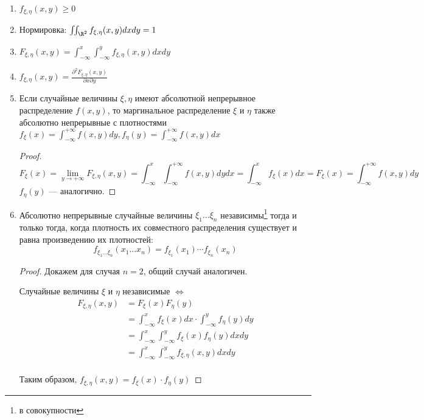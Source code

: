 \begin{prop}\itemfix
    \begin{enumerate}
        \item \(f_{\xi, \eta}(x, y) \geq 0\)
        \item Нормировка: \(\iint_{\R^2} f_{\xi, \eta}(x, y) dxdy = 1\)
        \item \(F_{\xi, \eta}(x, y) = \int_{-\infty}^x \int_{-\infty}^y f_{\xi, \eta}(x, y) dx dy\)
        \item \(f_{\xi, \eta}(x, y) = \frac{\partial^2 F_{\xi, \eta}(x, y)}{\partial x \partial y}\)
        \item Если случайные величины \(\xi, \eta\) имеют абсолютной непрерывное распределение \(f(x, y)\), то маргинальное распределение \(\xi\) и \(\eta\) также абсолютно непрерывные с плотностями \(f_\xi(x) = \int_{ -\infty}^{+\infty} f(x, y) dy, f_\eta(y) = \int_{ - \infty}^{+\infty} f(x, y) dx\)
              \begin{proof}
                  \[F_\xi(x) = \lim_{y \to +\infty} F_{\xi, \eta}(x, y) = \int_{ - \infty}^x \int_{ -\infty}^{+\infty} f(x, y) dy dx = \int_{ - \infty}^x f_\xi(x) dx = F_\xi(x) = \int_{ - \infty}^{+\infty} f(x, y) dy\]
                  \(f_\eta(y)\) --- аналогично.
              \end{proof}
        \item Абсолютно непрерывные случайные величины \(\xi_1 \dots \xi_n\) независимы\footnote{в совокупности} тогда и только тогда, когда плотность их совместного распределения существует и равна произведению их плотностей:
              \[f_{\xi_1 \dots \xi_n}(x_1 \dots x_n) = f_{\xi_1}(x_1) \cdots f_{\xi_n}(x_n)\]
              \begin{proof}
                  Докажем для случая \(n = 2\), общий случай аналогичен.

                  Случайные величины \(\xi\) и \(\eta\) независимые \(\Leftrightarrow\)
                  \begin{align*}
                      F_{\xi, \eta}(x, y) & =  F_\xi(x) F_\eta(y)                                                 \\
                                          & = \int_{ - \infty}^x f_\xi(x) dx \cdot \int_{ - \infty}^y f_\eta(y)dy \\
                                          & =  \int_{ - \infty}^x \int_{ - \infty}^y f_\xi(x) f_\eta(y) dx dy     \\
                                          & =  \int_{ - \infty}^x \int_{ - \infty}^y f_{\xi, \eta}(x, y) dx dy    \\
                  \end{align*}

                  Таким образом, \(f_{\xi, \eta}(x, y) = f_\xi(x) \cdot f_\eta(y)\)
              \end{proof}
    \end{enumerate}
\end{prop}

